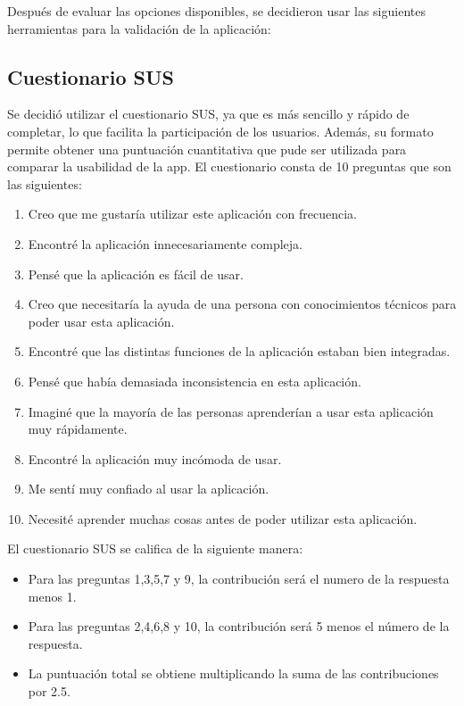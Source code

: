 Después de evaluar las opciones disponibles, se decidieron usar las siguientes herramientas para la validación de la aplicación:

\subsection{Cuestionario SUS}

Se decidió utilizar el cuestionario SUS, ya que es más sencillo y rápido de completar, lo que facilita la participación de los usuarios.
Además, su formato permite obtener una puntuación cuantitativa que pude ser utilizada para comparar la usabilidad de la app.
El cuestionario consta de 10 preguntas que son las siguientes: 

\begin{enumerate}
    \item Creo que me gustaría utilizar este aplicación con frecuencia.
    \item Encontré la aplicación innecesariamente compleja.
    \item Pensé que la aplicación es fácil de usar.
    \item Creo que necesitaría la ayuda de una persona con conocimientos técnicos para poder usar esta aplicación.
    \item Encontré que las distintas funciones de la aplicación estaban bien integradas.
    \item Pensé que había demasiada inconsistencia en esta aplicación.
    \item Imaginé que la mayoría de las personas aprenderían a usar esta aplicación muy rápidamente.
    \item Encontré la aplicación muy incómoda de usar.
    \item Me sentí muy confiado al usar la aplicación.
    \item Necesité aprender muchas cosas antes de poder utilizar esta aplicación.
\end{enumerate}


El cuestionario SUS se califica de la siguiente manera: 
\begin{itemize}
    \item Para las preguntas 1,3,5,7 y 9, la contribución será el numero de la respuesta menos 1.
    \item Para las preguntas 2,4,6,8 y 10, la contribución será 5 menos el número de la respuesta.
    \item La puntuación total se obtiene multiplicando la suma de las contribuciones por 2.5.
\end{itemize}

